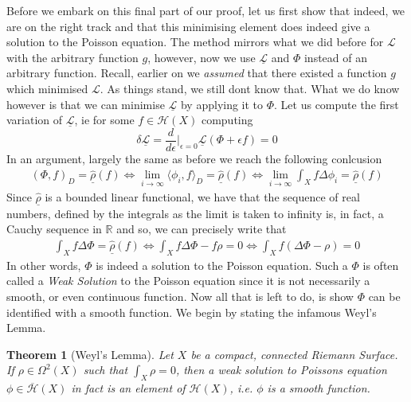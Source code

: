 \documentclass[11pt]{report}
\newtheorem{thm}{Theorem}[section]
\theoremstyle{definition}
\begin{document}
Before we embark on this final part of our proof, let us first show that indeed, we are on the right track and that this minimising element does indeed give a solution to the Poisson equation. The method mirrors what we did before for $\mathcal{L}$ with the arbitrary function $g$, however, now we use $\underline{\mathcal{L}}$ and $\Phi$ instead of an arbitrary function. Recall, earlier on we \emph{assumed} that there existed a function $g$ which minimised $\mathcal{L}$. As things stand, we still dont know that. What we do know however is that we can minimise $\underline{\mathcal{L}}$ by applying it to $\Phi$. Let us compute the first variation of $\underline{\mathcal{L}}$, ie for some $f\in \mathcal{H}(X)$ computing
 \[ \delta\underline{\mathcal{L}} =  \frac{d}{d\epsilon}\biggr\rvert_{\epsilon = 0} \underline{\mathcal{L}}(\Phi + \epsilon f) = 0\]
In an argument, largely the same as before we reach the following conlcusion
\begin{align*}
  (\Phi,f)_D = \underline{\hat{\rho}}(f) \Longleftrightarrow
  \lim_{i \rightarrow \infty}\langle \phi_i,f\rangle_D = \underline{\hat{\rho}}(f) \Longleftrightarrow
  \lim_{i \rightarrow \infty}\int_X f \Delta \phi_i = \underline{\hat{\rho}}(f) 
\end{align*}
Since $\underline{\hat{\rho}}$ is a bounded linear functional, we have that the sequence of real numbers, defined by the integrals as the limit is taken to infinity is, in fact, a Cauchy sequence in $\mathbb{R}$ and so, we can precisely write that 
\begin{align*} 
  \int_X f\Delta\Phi = \underline{\hat{\rho}}(f) \Longleftrightarrow
  \int_X f\Delta\Phi - f\rho = 0 \Longleftrightarrow
  \int_X f(\Delta\Phi - \rho) = 0
\end{align*}
In other words, $\Phi$ is indeed a solution to the Poisson equation. Such a $\Phi$ is often called a \emph{Weak Solution} to the Poisson equation since it is not necessarily a smooth, or even continuous function.
Now all that is left to do, is show $\Phi$ can be identified with a smooth function. We begin by stating the infamous Weyl's Lemma.
\begin{thm}[Weyl's Lemma]\label{WeylsLemmaCompact}
  Let $X$ be a compact, connected Riemann Surface. If $\rho \in \Omega^2(X)$ such that $\int_X \rho = 0$, then a weak solution to Poissons equation $\phi \in \overline{\mathcal{H}}(X)$ in fact is an element of $\mathcal{H}(X)$, i.e. $\phi$ is a smooth function.
\end{thm}
\end{document}

